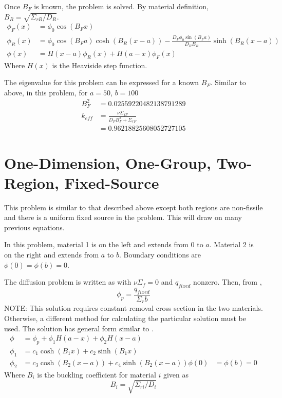   Once $B_F$ is known, the problem is solved. By material definition, 
  ${B_R = \sqrt{\Sigma_{rR}/D_R}}$.
  \begin{align}
    \phi_F(x) &= \phi_0 \cos(B_F x)\\
    \phi_R(x) &= \phi_0 \cos(B_F a) \cosh(B_R (x-a)) 
      - \frac{D_F \phi_0 \sin(B_F a)}{D_R B_R} \sinh(B_R (x-a))\\
    \phi(x) &= H(x-a)\phi_R(x) + H(a-x)\phi_F(x)
  \end{align}
  Where $H(x)$ is the Heaviside step function.  
  
  The eigenvalue for this problem can be expressed for a known $B_F$. Similar 
  to  above, in this problem, for $a=50$, $b=100$
  \begin{align}
    B_F^2  &= 0.02559220482138791289 \\
    k_{eff} &= \frac{\nu\Sigma_{fF}}{D_F B_F^2 + \Sigma_{rF}} \\
    &= 0.96218825608052727105
  \end{align}
  
\section{One-Dimension, One-Group, Two-Region, Fixed-Source}
  This problem is similar to that described above except both regions are 
  non-fissile and there is a uniform fixed source in the problem. This will 
  draw on many previous equations.
  
  In this problem, material 1 is on the left and extends from 0 to $a$. 
  Material 2 is on the right and extends from $a$ to $b$. Boundary conditions 
  are $\phi(0)=\phi(b)=0$.
  
  The diffusion problem is written as  with 
  $\nu \Sigma_f =0$ and $q_{fixed}$ nonzero. Then, from ,
  \begin{equation}
  	\phi_p = \frac{q_{fixed}}{\Sigma_r b}
  \end{equation}
  NOTE: This solution requires constant removal cross section in the two 
  materials. Otherwise, a different method for calculating the particular 
  solution must be used. The solution has general form similar to
  .
  \begin{align}
  	\phi &= \phi_p + \phi_1 H(a-x) + \phi_2 H(x-a) \\
    \phi_1 &= c_1 \cosh(B_1 x) + c_2 \sinh(B_1 x) \\
    \phi_2 &= c_3 \cosh(B_2 (x-a)) + c_4 \sinh(B_2 (x-a))
    \phi(0)&=\phi(b)=0
  \end{align}
  Where $B_i$ is the buckling coefficient for material $i$ given as
  \begin{equation}
    B_i = \sqrt{\Sigma_{ri} / D_i}
  \end{equation}
  
